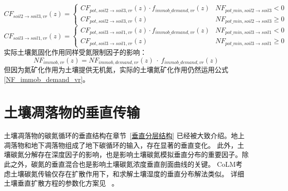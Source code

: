 \begin{equation}
    CF_{soil2 \rightarrow soil3, vr}(z)=\left\{\begin{array}{ll} CF_{pot, soil2 \rightarrow soil3, vr}(z) \cdot f_{immob\_demand, vr}(z) & NF_{pot\_{min, soil2 \rightarrow soil3}} <0 \\ 
    CF_{pot, soil2 \rightarrow soil3, vr}(z) & NF_{pot\_{min, soil2 \rightarrow soil3}} \geq 0
   \end{array}\right.
\end{equation}
\begin{equation}
    CF_{soil3 \rightarrow soil1, vr}(z)=\left\{\begin{array}{ll}C F_{pot, soil3 \rightarrow soil1, vr}(z) \cdot f_{immob\_demand, vr}(z) & NF_{pot\_{min, soil3 \rightarrow soil1}} <0 \\ 
    CF_{pot, soil3 \rightarrow soil1, vr}(z) & NF_{pot\_{min, soil3 \rightarrow soil1}} \geq 0
   \end{array}\right.
\end{equation}
实际土壤氮固化作用同样受氮限制因子的影响：
\begin{equation}
NF_{immob,vr}(z)=NF_{immob,demand,vr}(z)\ \cdot\ f_{immob\_{demand},vr}(z)
\end{equation}
但因为氮矿化作用为土壤提供无机氮，实际的土壤氮矿化作用仍然运用公式 \eqref{NF_immob_demand_vr}。


\section{土壤凋落物的垂直传输}\label{土壤凋落物的垂直传输}
土壤凋落物的碳氮循环的垂直结构在章节~\ref{垂直分层结构} 已经被大致介绍。地上凋落物和地下凋落物组成了地下碳循环的输入，存在显著的垂直变化。
此外，土壤碳氮分解存在深度因子的影响，也是影响土壤碳氮模拟垂直分布的重要因子。除此之外，碳氮的垂直混合也是影响土壤碳氮浓度垂直剖面曲线的关键。
CoLM考虑土壤碳氮传输仅存在扩散作用下，和求解土壤湿度的垂直分布解法类似。
详细土壤垂直扩散方程的参数化方案见~\citet{koven2009formation,koven2011permafrost,koven2013effect,koven2015permafrost} 。
